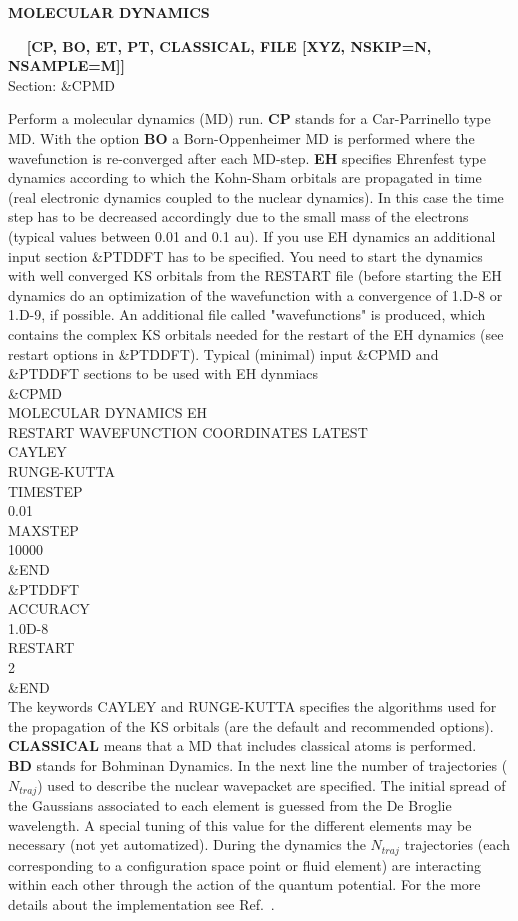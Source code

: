 \documentclass[twoside,10pt,titlepage,a4paper]{article}
\newcommand{\reflabel}[1]{\hypertarget{#1}}
\newcommand{\reflabel}[1]{\label{#1}}
\newcommand{\keyword}[5]{%
\vspace{1.0cm}
\begin{minipage}{15cm}
\reflabel{#1}{\textbf{\large #1}}%
\index{#1}%
\ \textbf{#2}%
\ \textbf{#3}%
\ \textit{#4}%
     \hfill\\\smallskip
     {Section: #5}
     \hfill\\\smallskip\vskip 10pt
\end{minipage}
}%
\newcommand{\desc}[1]{%
   \hspace*{\fill} \parbox{130mm}{\sloppy
                          {#1}%
                             }
     \hfill\\\smallskip
   }%
\newcommand{\desc}[1]{#1\vspace{1ex}}
\begin{document}
\keyword{MOLECULAR DYNAMICS}{}{[CP, BO, ET, PT, CLASSICAL, FILE [XYZ, NSKIP=N, NSAMPLE=M]]}{}{\&CPMD}
  \desc{Perform a molecular dynamics (MD) run.
      {\bf CP} stands for a Car-Parrinello type MD.
      With the option {\bf BO} a Born-Oppenheimer MD is performed
      where the wavefunction is re-converged after each MD-step. 
      {\bf EH} specifies Ehrenfest type dynamics according to which the Kohn-Sham
      orbitals are propagated in time (real electronic dynamics coupled to the nuclear dynamics). 
      In this case the time step has to be decreased accordingly due to the small mass of the
      electrons (typical values between 0.01 and 0.1 au). If you use EH dynamics an additional input
      section {\&PTDDFT} has to be specified. You need to start the dynamics with well converged
      KS orbitals from the RESTART file (before starting the EH dynamics do an optimization of the
      wavefunction with a convergence of {1.D-8} or {1.D-9}, if possible. An additional file
      called "wavefunctions" is produced, which contains the complex KS orbitals needed for
      the restart of the EH dynamics (see restart options in {\&PTDDFT}). Typical (minimal) input
      \&CPMD and \&PTDDFT sections to be used with EH dynmiacs\\
      \&CPMD \\
        MOLECULAR DYNAMICS EH \\
        RESTART WAVEFUNCTION COORDINATES LATEST \\
        CAYLEY \\
        RUNGE-KUTTA \\
        TIMESTEP \\ 
        0.01 \\
        MAXSTEP \\ 
        10000 \\
     \&END \\
     \&PTDDFT \\
       ACCURACY \\ 
       1.0D-8 \\ 
       RESTART \\ 
       2 \\
     \&END \\
      The keywords CAYLEY and RUNGE-KUTTA specifies the algorithms used for the propagation of the KS
      orbitals (are the default and recommended options).\\
      {\bf CLASSICAL }
      means that a MD that includes classical atoms is performed.\\
      {\bf BD} stands for Bohminan Dynamics. In the next line the number of trajectories
      ($N_{traj}$) used to describe the nuclear wavepacket are specified.
      The initial spread of the Gaussians associated to each element is guessed from the De Broglie wavelength.
      A special tuning of this value for the different elements may be necessary (not yet automatized).
      During the dynamics the $N_{traj}$ trajectories (each corresponding to a configuration space point or
      fluid element) are interacting within each other through the action of the quantum potential.
      For the more details about the implementation see Ref.~\cite{ABDY}.

}
\end{document}
